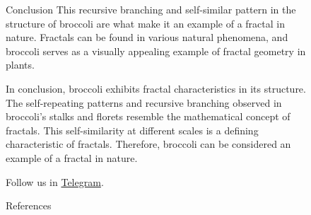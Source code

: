 \documentclass[]{beamer}
\begin{document}
\begin{frame}[t]
\begin{columns}[t]
\begin{column}{\onecolwid}
    
    \end{column}
    
    
    \begin{column}{\sepwid}\end{column} %
    
    \begin{column}{\onecolwid} %
    
        
        \begin{block}{Conclusion}
        This recursive branching and self-similar pattern in the structure of broccoli are what make it an example of a fractal in nature. Fractals can be found in various natural phenomena, and broccoli serves as a visually appealing example of fractal geometry in plants.
    
        In conclusion, broccoli exhibits fractal characteristics in its structure. 
        The self-repeating patterns and recursive branching observed in broccoli's stalks and florets resemble the mathematical concept of fractals. 
        This self-similarity at different scales is a defining characteristic of fractals. Therefore, broccoli can be considered an example of a fractal in nature.
            
        Follow us in \href{https://t.me/vega_institute}{Telegram}.
        
        \end{block}
        
        
        \begin{block}{References}
        
        \printbibliography \vspace{0.75in}
        
        \end{block}
        
        \end{column} %
    
    \begin{column}{\lrmargin}\end{column} %
    
    \end{columns} %
    \end{frame} %
\end{document}
